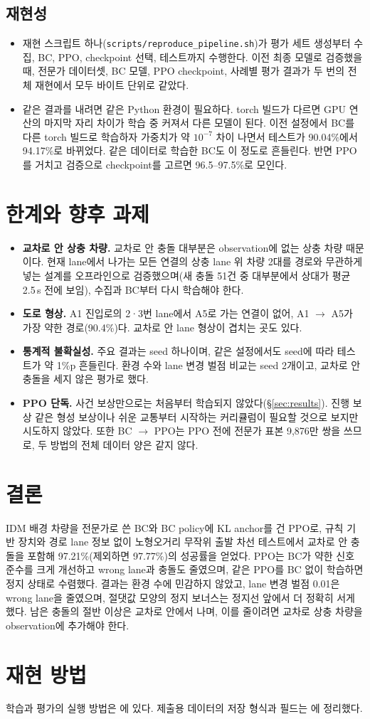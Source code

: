 \documentclass[10pt,a4paper]{article}
\begin{document}
\subsection{재현성}
\begin{itemize}
  \item 재현 스크립트 하나(\texttt{scripts/reproduce\_pipeline.sh})가 평가 세트 생성부터 수집, BC, PPO, checkpoint 선택, 테스트까지 수행한다. 이전 최종 모델로 검증했을 때, 전문가 데이터셋, BC 모델, PPO checkpoint, 사례별 평가 결과가 두 번의 전체 재현에서 모두 바이트 단위로 같았다.
  \item 같은 결과를 내려면 같은 Python 환경이 필요하다. torch 빌드가 다르면 GPU 연산의 마지막 자리 차이가 학습 중 커져서 다른 모델이 된다. 이전 설정에서 BC를 다른 torch 빌드로 학습하자 가중치가 약 $10^{-7}$ 차이 나면서 테스트가 90.04\%에서 94.17\%로 바뀌었다. 같은 데이터로 학습한 BC도 이 정도로 흔들린다. 반면 PPO를 거치고 검증으로 checkpoint를 고르면 96.5--97.5\%로 모인다.
\end{itemize}

\section{한계와 향후 과제}\label{sec:limits}
\begin{itemize}
  \item \textbf{교차로 안 상충 차량.} 교차로 안 충돌 대부분은 observation에 없는 상충 차량 때문이다. 현재 lane에서 나가는 모든 연결의 상충 lane 위 차량 2대를 경로와 무관하게 넣는 설계를 오프라인으로 검증했으며(새 충돌 51건 중 대부분에서 상대가 평균 2.5\,s 전에 보임), 수집과 BC부터 다시 학습해야 한다.
  \item \textbf{도로 형상.} A1 진입로의 2·3번 lane에서 A5로 가는 연결이 없어, A1 $\rightarrow$ A5가 가장 약한 경로(90.4\%)다. 교차로 안 lane 형상이 겹치는 곳도 있다.
  \item \textbf{통계적 불확실성.} 주요 결과는 seed 하나이며, 같은 설정에서도 seed에 따라 테스트가 약 1\%p 흔들린다. 환경 수와 lane 변경 벌점 비교는 seed 2개이고, 교차로 안 충돌을 세지 않은 평가로 했다.
  \item \textbf{PPO 단독.} 사건 보상만으로는 처음부터 학습되지 않았다(\S\ref{sec:results}). 진행 보상 같은 형성 보상이나 쉬운 교통부터 시작하는 커리큘럼이 필요할 것으로 보지만 시도하지 않았다. 또한 BC $\rightarrow$ PPO는 PPO 전에 전문가 표본 9,876만 쌍을 쓰므로, 두 방법의 전체 데이터 양은 같지 않다.
\end{itemize}

\section{결론}
IDM 배경 차량을 전문가로 쓴 BC와 BC policy에 KL anchor를 건 PPO로, 규칙 기반 장치와 경로 lane 정보 없이 노형오거리 무작위 출발 차선 테스트에서 교차로 안 충돌을 포함해 97.21\%(제외하면 97.77\%)의 성공률을 얻었다. PPO는 BC가 약한 신호 준수를 크게 개선하고 wrong lane과 충돌도 줄였으며, 같은 PPO를 BC 없이 학습하면 정지 상태로 수렴했다. 결과는 환경 수에 민감하지 않았고, lane 변경 벌점 0.01은 wrong lane을 줄였으며, 절댓값 모양의 정지 보너스는 정지선 앞에서 더 정확히 서게 했다. 남은 충돌의 절반 이상은 교차로 안에서 나며, 이를 줄이려면 교차로 상충 차량을 observation에 추가해야 한다.

\appendix
\section{재현 방법}
학습과 평가의 실행 방법은 에 있다.
제출용 데이터의 저장 형식과 필드는 에 정리했다.
\end{document}
